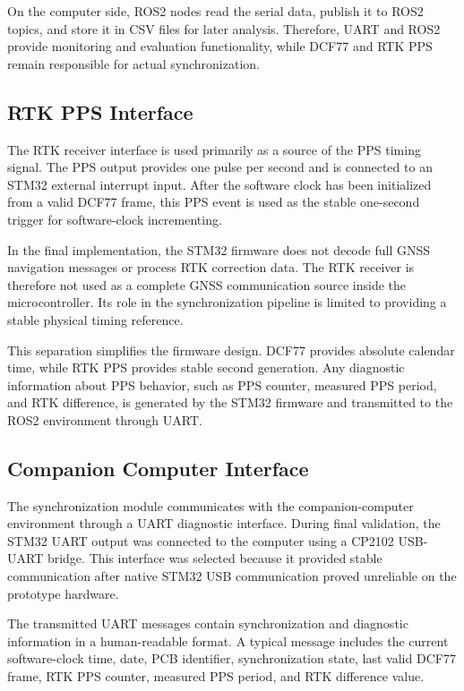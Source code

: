 On the computer side, ROS2 nodes read the serial data, publish it to ROS2 topics, and store it in CSV files for later analysis. Therefore, UART and ROS2 provide monitoring and evaluation functionality, while DCF77 and RTK PPS remain responsible for actual synchronization.

\subsection{RTK PPS Interface}

The RTK receiver interface is used primarily as a source of the PPS timing signal. The PPS output provides one pulse per second and is connected to an STM32 external interrupt input. After the software clock has been initialized from a valid DCF77 frame, this PPS event is used as the stable one-second trigger for software-clock incrementing.

In the final implementation, the STM32 firmware does not decode full GNSS navigation messages or process RTK correction data. The RTK receiver is therefore not used as a complete GNSS communication source inside the microcontroller. Its role in the synchronization pipeline is limited to providing a stable physical timing reference.

This separation simplifies the firmware design. DCF77 provides absolute calendar time, while RTK PPS provides stable second generation. Any diagnostic information about PPS behavior, such as PPS counter, measured PPS period, and RTK difference, is generated by the STM32 firmware and transmitted to the ROS2 environment through UART.

\subsection{Companion Computer Interface}

The synchronization module communicates with the companion-computer environment through a UART diagnostic interface. During final validation, the STM32 UART output was connected to the computer using a CP2102 USB-UART bridge. This interface was selected because it provided stable communication after native STM32 USB communication proved unreliable on the prototype hardware.

The transmitted UART messages contain synchronization and diagnostic information in a human-readable format. A typical message includes the current software-clock time, date, PCB identifier, synchronization state, last valid DCF77 frame, RTK PPS counter, measured PPS period, and RTK difference value.


